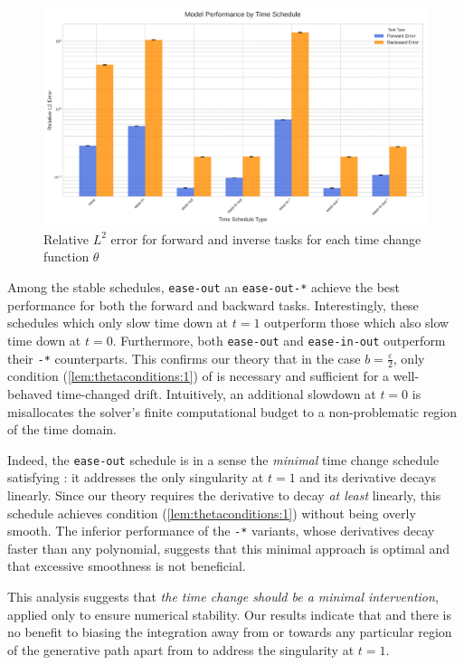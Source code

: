 \begin{figure}[tbhp]
\centering
\includegraphics[width=\linewidth]{schedules.png}
\caption{Relative \(L^{2}\) error for forward and inverse tasks for each time change function \(\theta\)}\label{fig:schedulesr}
\end{figure}

Among the stable schedules, \texttt{ease-out} an \texttt{ease-out-*} achieve the best performance for both the forward and backward tasks. Interestingly, these schedules which only slow time down at \(t=1\) outperform those which also slow time down at \(t=0\). Furthermore, both \texttt{ease-out} and \texttt{ease-in-out} outperform their \texttt{-*} counterparts. This confirms our theory that in the case \(b = \frac{\varepsilon}{2}\), only condition (\ref{lem:thetaconditions:1}) of  is necessary and sufficient for a well-behaved time-changed drift.  Intuitively, an additional slowdown at \(t=0\) is misallocates the solver's finite computational budget to a non-problematic region of the time domain.

Indeed, the \texttt{ease-out} schedule is in a sense the \textit{minimal} time change schedule satisfying :  it addresses the only singularity at \(t=1\) and its derivative decays linearly. Since our theory requires the derivative to decay \textit{at least} linearly, this schedule achieves condition (\ref{lem:thetaconditions:1}) without being overly smooth. The inferior performance of the \texttt{-*} variants, whose derivatives decay faster than any polynomial, suggests that this minimal approach is optimal and that excessive smoothness is not beneficial.

This analysis suggests that \textit{the time change should be a minimal intervention}, applied only to ensure numerical stability. Our results indicate that and there is no benefit to biasing the integration away from or towards any particular region of the generative path apart from to address the singularity at \(t=1\).


